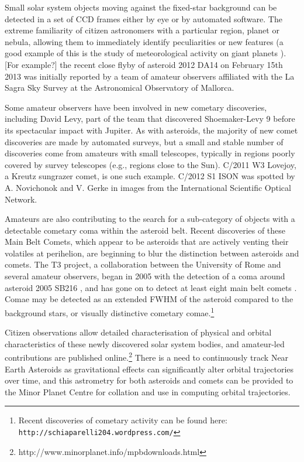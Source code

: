 \documentclass{ar2e}
\begin{document}
Small solar system objects moving against the fixed-star background can be
detected in a set of CCD frames either by eye or by automated software. The
extreme familiarity of citizen astronomers with a particular region, planet or
nebula, allowing them to immediately identify peculiarities or new features (a
good example of this is the study of meteorological activity on giant planets
\citep{95rogers}).   [For example?] the recent close flyby of asteroid 2012 DA14
on February 15th 2013 was initially reported by a team of amateur observers
affiliated with the La Sagra Sky Survey at the Astronomical Observatory of
Mallorca.  

Some amateur observers have been involved in new cometary discoveries, including
David Levy, part of the team that discovered Shoemaker-Levy 9 before its
spectacular impact with Jupiter.   As with asteroids, the majority of new comet discoveries are
made by automated surveys, but a small and stable number of discoveries come
from amateurs with small telescopes, typically in regions poorly covered by
survey telescopes (e.g., regions close to the Sun).   C/2011 W3 Lovejoy, a
Kreutz sungrazer comet, is one such example.  C/2012 S1 ISON was spotted by A.
Novichonok and V. Gerke in images from the International Scientific Optical
Network.  

Amateurs are also contributing to the search for a sub-category of objects
with a detectable cometary coma within the asteroid belt.  Recent discoveries
of these Main Belt Comets, which appear to be asteroids that are actively
venting their volatiles at perihelion, are beginning to blur the distinction
between asteroids and comets.  The T3 project, a collaboration between the
University of Rome and several amateur observers, began in 2005 with the
detection of a coma around asteroid 2005 SB216 \citep{05buzzi}, and has gone
on to detect at least eight main belt comets \citep{13mousis}. Comae may be
detected as an extended FWHM of the asteroid compared to the background stars,
or visually distinctive cometary comae.\footnote{Recent discoveries of cometary
activity can be found here: \texttt{http://schiaparelli204.wordpress.com/}}

Citizen observations allow detailed characterisation of physical and orbital
characteristics of these newly discovered solar system bodies, and amateur-led
contributions are published
online.\footnote{http://www.minorplanet.info/mpbdownloads.html}  There is a need
to continuously track Near Earth Asteroids as gravitational effects can
significantly alter orbital trajectories over time, and this astrometry for both
asteroids and comets can be provided to the Minor Planet Centre for collation
and use in computing orbital trajectories.  
\end{document}
